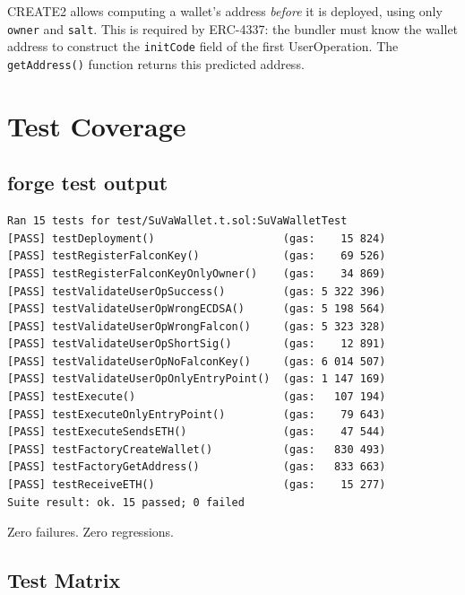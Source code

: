 \documentclass[11pt,a4paper]{article}
\begin{document}
\begin{infobox}
CREATE2 allows computing a wallet's address \textit{before} it is deployed, using only
\texttt{owner} and \texttt{salt}. This is required by ERC-4337: the bundler must know
the wallet address to construct the \texttt{initCode} field of the first UserOperation.
The \texttt{getAddress()} function returns this predicted address.
\end{infobox}

\section{Test Coverage}

\subsection{forge test output}

\begin{lstlisting}[style=bash, caption={forge test --match-path test/SuVaWallet.t.sol -vv}]
Ran 15 tests for test/SuVaWallet.t.sol:SuVaWalletTest
[PASS] testDeployment()                    (gas:    15 824)
[PASS] testRegisterFalconKey()             (gas:    69 526)
[PASS] testRegisterFalconKeyOnlyOwner()    (gas:    34 869)
[PASS] testValidateUserOpSuccess()         (gas: 5 322 396)
[PASS] testValidateUserOpWrongECDSA()      (gas: 5 198 564)
[PASS] testValidateUserOpWrongFalcon()     (gas: 5 323 328)
[PASS] testValidateUserOpShortSig()        (gas:    12 891)
[PASS] testValidateUserOpNoFalconKey()     (gas: 6 014 507)
[PASS] testValidateUserOpOnlyEntryPoint()  (gas: 1 147 169)
[PASS] testExecute()                       (gas:   107 194)
[PASS] testExecuteOnlyEntryPoint()         (gas:    79 643)
[PASS] testExecuteSendsETH()               (gas:    47 544)
[PASS] testFactoryCreateWallet()           (gas:   830 493)
[PASS] testFactoryGetAddress()             (gas:   833 663)
[PASS] testReceiveETH()                    (gas:    15 277)
Suite result: ok. 15 passed; 0 failed
\end{lstlisting}

\begin{resultbox}
Zero failures. Zero regressions.
\end{resultbox}

\subsection{Test Matrix}
\end{document}
